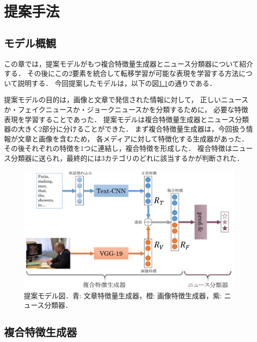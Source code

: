 %
\chapter{提案手法}
%
\section{モデル概観}
この章では，提案モデルがもつ複合特徴量生成器とニュース分類器について紹介する．
その後にこの2要素を統合して転移学習が可能な表現を学習する方法について説明する．
今回提案したモデルは，以下の図\ref{fig:model}の通りである．

提案モデルの目的は，画像と文章で発信された情報に対して，
正しいニュースか・フェイクニュースか・ジョークニュースかを分類するために，
必要な特徴表現を学習することであった．
提案モデルは複合特徴量生成器とニュース分類器の大きく2部分に分けることができた．
まず複合特徴量生成器は，今回扱う情報が文章と画像を含むため，
各メディアに対して特徴化する生成器があった．
その後それぞれの特徴を1つに連結し，複合特徴を形成した．
複合特徴はニュース分類器に送られ，最終的には3カテゴリのどれに該当するかが判断された．
% 
\begin{figure}[H]
    \centering
    \includegraphics[width=\linewidth]{images/methodology.pdf}
    \caption{提案モデル図．青: 文章特徴量生成器，橙: 画像特徴生成器，紫: ニュース分類器．}
    \label{fig:model}
\end{figure}
%
\section{複合特徴生成器}
%
